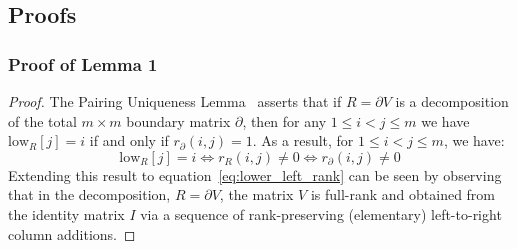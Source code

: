 \documentclass[10pt]{article}
\numberwithin{equation}{section}
\newcommand{\+}{%
	\raisebox{0.18ex}{\scaleobj{0.55}{+}}
}
\theoremstyle{definition}
\begin{document}
\subsection{Proofs}
\subsubsection*{Proof of Lemma 1}
\begin{proof}
	The Pairing Uniqueness Lemma~\cite{dey2022computational} asserts that if $R = \partial V$ is a decomposition of the total $m \times m$ boundary matrix $\partial$, then for any $1 \leq i < j \leq m$ we have $\mathrm{low}_R[j] = i$ if and only if $r_\partial(i,j) = 1$. 
	As a result, for $1 \leq i < j \leq m$, we have:
\begin{equation}
	\mathrm{low}_R[j] = i \iff r_R(i,j) \neq 0 \iff r_\partial(i,j) \neq 0
\end{equation} 
Extending this result to equation~\eqref{eq:lower_left_rank} can be seen by observing that in the decomposition, $R = \partial V$, the matrix $V$ is full-rank and obtained from the identity matrix $I$ via a sequence of rank-preserving (elementary) left-to-right column additions.  
\end{proof}
\end{document}
